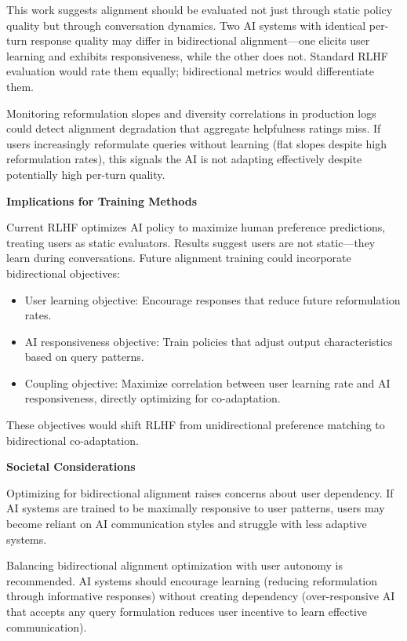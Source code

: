 This work suggests alignment should be evaluated not just through static policy quality but through conversation dynamics. Two AI systems with identical per-turn response quality may differ in bidirectional alignment---one elicits user learning and exhibits responsiveness, while the other does not. Standard RLHF evaluation would rate them equally; bidirectional metrics would differentiate them.

Monitoring reformulation slopes and diversity correlations in production logs could detect alignment degradation that aggregate helpfulness ratings miss. If users increasingly reformulate queries without learning (flat slopes despite high reformulation rates), this signals the AI is not adapting effectively despite potentially high per-turn quality.

\textbf{Implications for Training Methods}

Current RLHF optimizes AI policy to maximize human preference predictions, treating users as static evaluators. Results suggest users are not static---they learn during conversations. Future alignment training could incorporate bidirectional objectives:

\begin{itemize}
\item User learning objective: Encourage responses that reduce future reformulation rates.
\item AI responsiveness objective: Train policies that adjust output characteristics based on query patterns.
\item Coupling objective: Maximize correlation between user learning rate and AI responsiveness, directly optimizing for co-adaptation.
\end{itemize}

These objectives would shift RLHF from unidirectional preference matching to bidirectional co-adaptation.

\textbf{Societal Considerations}

Optimizing for bidirectional alignment raises concerns about user dependency. If AI systems are trained to be maximally responsive to user patterns, users may become reliant on AI communication styles and struggle with less adaptive systems.

Balancing bidirectional alignment optimization with user autonomy is recommended. AI systems should encourage learning (reducing reformulation through informative responses) without creating dependency (over-responsive AI that accepts any query formulation reduces user incentive to learn effective communication).

